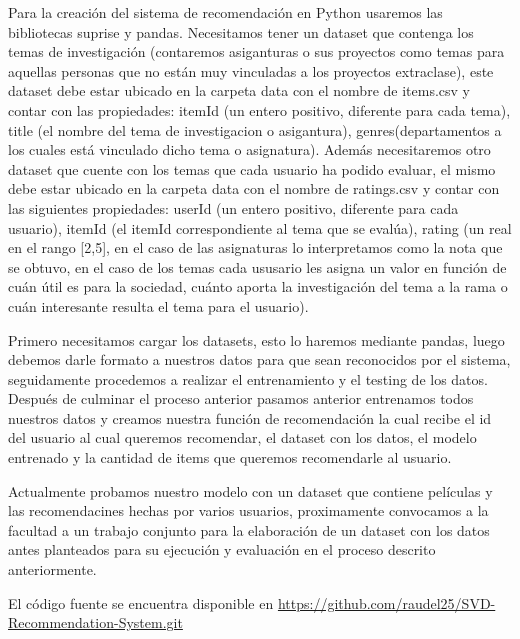 \documentclass{article}
\begin{document}
Para la creación del sistema de recomendación en Python usaremos las bibliotecas suprise y pandas.
Necesitamos tener un dataset que contenga los temas de investigación (contaremos asiganturas o sus proyectos como temas para aquellas personas que no están muy vinculadas a los proyectos extraclase), este dataset debe estar ubicado en la carpeta data con el nombre de items.csv y contar con las propiedades: itemId (un entero positivo, diferente para cada tema), title (el nombre del tema de investigacion o asigantura), genres(departamentos a los cuales está vinculado dicho tema o asignatura).
Además necesitaremos otro dataset que cuente con los temas que cada usuario ha podido evaluar, el mismo debe estar ubicado en la carpeta data con el nombre de ratings.csv y contar con las siguientes propiedades: userId (un entero positivo, diferente para cada usuario), itemId (el itemId correspondiente al tema que se evalúa), rating (un real en el rango [2,5], en el caso de las asignaturas lo interpretamos como la nota que se obtuvo, en el caso de los temas cada ususario les asigna un valor en función de cuán útil es para la sociedad, cuánto aporta la investigación del tema a la rama o cuán interesante resulta el tema para el usuario).

Primero necesitamos cargar los datasets, esto lo haremos mediante pandas, luego debemos darle formato a nuestros datos para que sean reconocidos por el sistema, seguidamente procedemos a realizar el entrenamiento y el testing de los datos. Después de culminar el proceso anterior pasamos anterior entrenamos todos nuestros datos y creamos nuestra función de recomendación la cual recibe el id del usuario al cual queremos recomendar, el dataset con los datos, el modelo entrenado y la cantidad de items que queremos recomendarle al usuario.

Actualmente probamos nuestro modelo con un dataset que contiene películas y las recomendacines hechas por varios usuarios, proximamente convocamos a la facultad a un trabajo conjunto para la elaboración de un dataset con los datos antes planteados para su ejecución y evaluación en el proceso descrito anteriormente.

El código fuente se encuentra disponible en \url{https://github.com/raudel25/SVD-Recommendation-System.git}
\end{document}
